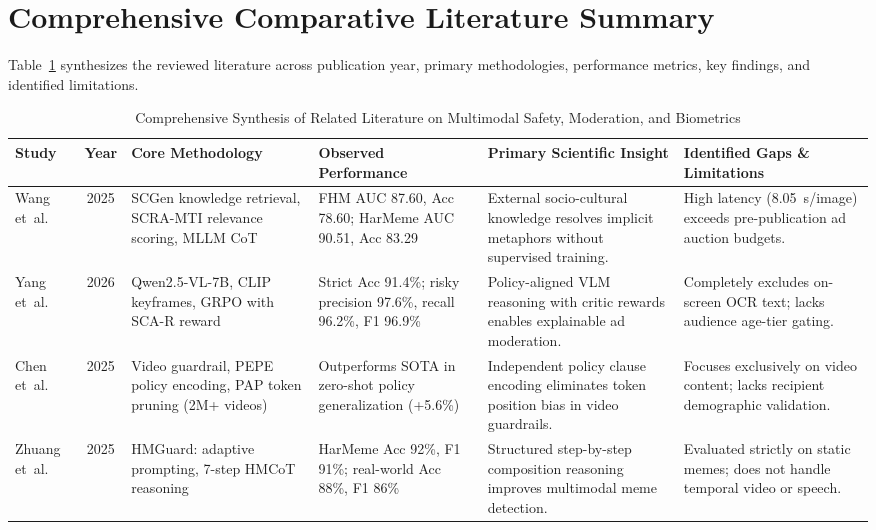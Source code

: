 \documentclass[12pt,a4paper]{report}
\begin{document}
\section{Comprehensive Comparative Literature Summary}

Table~\ref{tab:lit_comprehensive} synthesizes the reviewed literature across publication year, primary methodologies, performance metrics, key findings, and identified limitations.

\begin{table}[htbp]
\centering
\caption{Comprehensive Synthesis of Related Literature on Multimodal Safety, Moderation, and Biometrics}
\label{tab:lit_comprehensive}
\vspace*{3pt}
\scriptsize
\setlength{\tabcolsep}{2.0pt}
\renewcommand{\arraystretch}{1.25}

\begin{tabular}{|p{1.4cm}|c|p{3.2cm}|p{3.4cm}|p{4.2cm}|p{3.4cm}|}
\hline
\textbf{Study} & \textbf{Year} & \textbf{Core Methodology} & \textbf{Observed Performance} & \textbf{Primary Scientific Insight} & \textbf{Identified Gaps \& Limitations} \\ \hline

Wang et~al.~\cite{wang2025} & 2025 &
SCGen knowledge retrieval, SCRA-MTI relevance scoring, MLLM CoT &
FHM AUC 87.60, Acc 78.60; HarMeme AUC 90.51, Acc 83.29 &
External socio-cultural knowledge resolves implicit metaphors without supervised training. &
High latency (8.05~s/image) exceeds pre-publication ad auction budgets. \\ \hline

Yang et~al.~\cite{blmguard2026} & 2026 &
Qwen2.5-VL-7B, CLIP keyframes, GRPO with SCA-R reward &
Strict Acc 91.4\%; risky precision 97.6\%, recall 96.2\%, F1 96.9\% &
Policy-aligned VLM reasoning with critic rewards enables explainable ad moderation. &
Completely excludes on-screen OCR text; lacks audience age-tier gating. \\ \hline

Chen et~al.~\cite{safewatch2025} & 2025 &
Video guardrail, PEPE policy encoding, PAP token pruning (2M+ videos) &
Outperforms SOTA in zero-shot policy generalization (+5.6\%) &
Independent policy clause encoding eliminates token position bias in video guardrails. &
Focuses exclusively on video content; lacks recipient demographic validation. \\ \hline

Zhuang et~al.~\cite{zhuang2025} & 2025 &
HMGuard: adaptive prompting, 7-step HMCoT reasoning &
HarMeme Acc 92\%, F1 91\%; real-world Acc 88\%, F1 86\% &
Structured step-by-step composition reasoning improves multimodal meme detection. &
Evaluated strictly on static memes; does not handle temporal video or speech. \\ \hline


\end{tabular}
\end{table}
\end{document}
